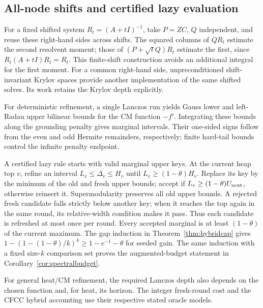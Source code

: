 \subsection{All-node shifts and certified lazy evaluation}
For a fixed shifted system $R_t=(A+tI)^{-1}$, take $P=ZC$,
$Q$ independent, and reuse these right-hand sides across shifts.
The squared columns of $QR_t$ estimate the second resolvent
moment; those of $(P+\sqrt tQ)R_t$ estimate the first, since
$R_t(A+tI)R_t=R_t$. This finite-shift construction avoids an
additional integral for the first moment. For a common right-hand
side, unpreconditioned shift-invariant Krylov spaces provide another
implementation of the same shifted solves. Its work retains the
Krylov depth explicitly.

For deterministic refinement, a single Lanczos run yields Gauss
lower and left-Radau upper bilinear bounds for the CM function
$-f'$. Integrating these bounds along the grounding penalty gives
marginal intervals. Their one-sided signs follow from the even
and odd Hermite remainders, respectively; finite hard-tail bounds
control the infinite penalty endpoint.

A certified lazy rule starts with valid marginal upper keys.
At the current heap top $v$, refine an interval
$L_v\leq\Delta_v\leq H_v$ until
$L_v\geq(1-\theta)H_v$. Replace its key by the minimum of the
old and fresh upper bounds; accept if
$L_v\geq(1-\theta)U_{\rm next}$, otherwise reinsert it.
Supermodularity preserves all old upper bounds. A rejected fresh
candidate falls strictly below another key; when it reaches the
top again in the same round, its relative-width condition makes
it pass. Thus each candidate is refreshed at most once per round.
Every accepted marginal is at least $(1-\theta)$ of the current
maximum. The gap induction in Theorem~\ref{thm:hybridcap} gives
$1-(1-(1-\theta)/k)^k\geq1-e^{-1}-\theta$ for seeded gain.
The same induction with a fixed size-$k$ comparison set proves
the augmented-budget statement in Corollary~\ref{cor:spectralbudget}.

For general heat/CM refinement, the required Lanczos depth also
depends on the chosen function and, for heat, its horizon.
The integer fresh-round cost and the CFCC hybrid accounting use
their respective stated oracle models.


